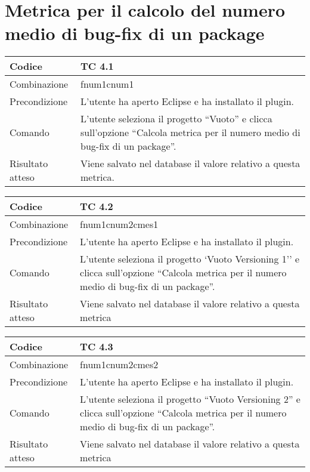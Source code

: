 \clearpage

\section{Metrica per il calcolo del numero medio di bug-fix di un package}

\begin{table}[ht]
\begin{tabular}{|p{3cm}|p{9cm}|}
\hline
\cellcolor{lightgray}Codice				& TC 4.1								\\
\hline
\cellcolor{lightgray}Combinazione		& fnum1cnum1									\\
\hline
\cellcolor{lightgray}Precondizione		& L'utente ha aperto Eclipse e ha installato il plugin.		\\
\hline
\cellcolor{lightgray}Comando			& L'utente seleziona il progetto ``Vuoto''  e clicca sull'opzione ``Calcola metrica per il numero medio di bug-fix di un package''.	\\
\hline
\cellcolor{lightgray}Risultato atteso	& Viene salvato nel database il valore relativo a questa metrica.\\
\hline
\end{tabular}
\end{table}

\begin{table}[ht]
\begin{tabular}{|p{3cm}|p{9cm}|}
\hline
\cellcolor{lightgray}Codice				& TC 4.2								\\
\hline
\cellcolor{lightgray}Combinazione		& fnum1cnum2cmes1 									\\
\hline
\cellcolor{lightgray}Precondizione		& L'utente ha aperto Eclipse e ha installato il plugin.				\\
\hline
\cellcolor{lightgray}Comando			& L'utente seleziona il progetto `Vuoto Versioning 1''  e clicca sull'opzione ``Calcola metrica per il numero medio di bug-fix di un package''.	\\
\hline
\cellcolor{lightgray}Risultato atteso	& Viene salvato nel database il valore relativo a questa metrica	\\
\hline
\end{tabular}
\end{table}

\begin{table}[ht]
\begin{tabular}{|p{3cm}|p{9cm}|}
\hline
\cellcolor{lightgray}Codice				& TC 4.3								\\
\hline
\cellcolor{lightgray}Combinazione		& fnum1cnum2cmes2									\\
\hline
\cellcolor{lightgray}Precondizione		& L'utente ha aperto Eclipse e ha installato il plugin.					\\
\hline
\cellcolor{lightgray}Comando			& L'utente seleziona il progetto ``Vuoto Versioning 2''  e clicca sull'opzione ``Calcola metrica per il numero medio di bug-fix di un package''.	\\
\hline
\cellcolor{lightgray}Risultato atteso	& Viene salvato nel database il valore relativo a questa metrica	\\
\hline
\end{tabular}
\end{table}

